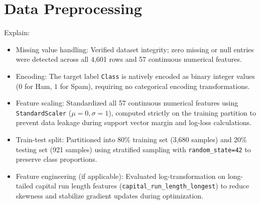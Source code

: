 \documentclass[12pt,a4paper]{article}
\begin{document}
\section{Data Preprocessing}

Explain:
\begin{itemize}
\item Missing value handling: Verified dataset integrity; zero missing or null entries were detected across all 4,601 rows and 57 continuous numerical features.
\item Encoding: The target label \texttt{Class} is natively encoded as binary integer values ($0$ for Ham, $1$ for Spam), requiring no categorical encoding transformations.
\item Feature scaling: Standardized all 57 continuous numerical features using \texttt{StandardScaler} ($\mu = 0, \sigma = 1$), computed strictly on the training partition to prevent data leakage during support vector margin and log-loss calculations.
\item Train-test split: Partitioned into 80\% training set (3,680 samples) and 20\% testing set (921 samples) using stratified sampling with \texttt{random\_state=42} to preserve class proportions.
\item Feature engineering (if applicable): Evaluated log-transformation on long-tailed capital run length features (\texttt{capital\_run\_length\_longest}) to reduce skewness and stabilize gradient updates during optimization.
\end{itemize}
\end{document}
